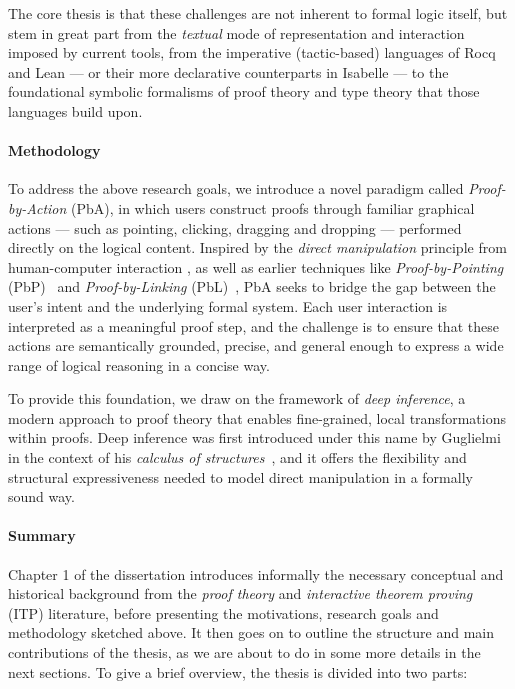\documentclass[11pt]{article}
\begin{document}
The core thesis is that these challenges are not inherent to formal logic itself, but stem in great part from the \emph{textual} mode of representation and interaction imposed by current tools, from the imperative (tactic-based) languages of Rocq and Lean --- or their more declarative counterparts in Isabelle --- to the foundational symbolic formalisms of proof theory and type theory that those languages build upon.

\paragraph{Methodology}

To address the above research goals, we introduce a novel paradigm called \emph{Proof-by-Action} (PbA), in which users construct proofs through familiar graphical actions --- such as pointing, clicking, dragging and dropping --- performed directly on the logical content. Inspired by the \emph{direct manipulation} principle from human-computer interaction \cite{shneiderman_direct_1983}, as well as earlier techniques like \emph{Proof-by-Pointing} (PbP)~\cite{PbP} and \emph{Proof-by-Linking} (PbL)~\cite{chaudhuri_certifying_2022}, PbA seeks to bridge the gap between the user's intent and the underlying formal system. Each user interaction is interpreted as a meaningful proof step, and the challenge is to ensure that these actions are semantically grounded, precise, and general enough to express a wide range of logical reasoning in a concise way.

To provide this foundation, we draw on the framework of \emph{deep inference}, a modern approach to proof theory that enables fine-grained, local transformations within proofs. Deep inference was first introduced under this name by Guglielmi in the context of his \emph{calculus of structures}~\cite{Guglielmi1999ACO}, and it offers the flexibility and structural expressiveness needed to model direct manipulation in a formally sound way.

\paragraph{Summary}

Chapter 1 of the dissertation introduces informally the necessary conceptual and historical background from the \emph{proof theory} and \emph{interactive theorem proving} (ITP) literature, before presenting the motivations, research goals and methodology sketched above. It then goes on to outline the structure and main contributions of the thesis, as we are about to do in some more details in the next sections. To give a brief overview, the thesis is divided into two parts:
\end{document}
